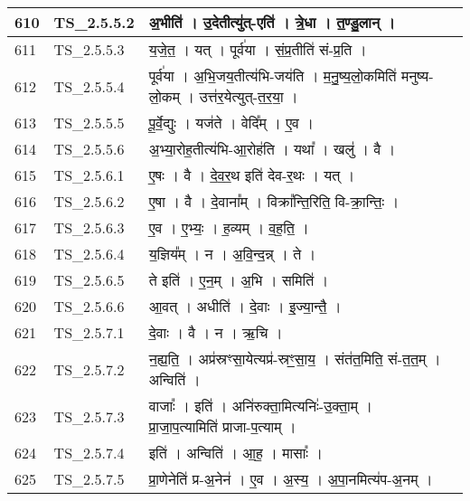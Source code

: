 \documentclass[17pt]{extarticle}
\begin{document}
\begin{longtable}{||p{0.4in}||p{0.9in}||p{4.0in}||p{0.9in}||}
        \hline
            610 & TS\_2.5.5.2 & अ॒भीति॑   ।   उ॒देतीत्यु॑त्{-}एति॑   ।   त्रे॒धा   ।   त॒ण्डु॒लान्   ।    &      \\
        \hline
            611 & TS\_2.5.5.3 & य॒जे॒त॒   ।   यत्   ।   पूर्व॑या   ।   सं॒प्र॒तीति॑ सं{-}प्र॒ति   ।    &      \\
        \hline
            612 & TS\_2.5.5.4 & पूर्व॑या   ।   अ॒भि॒जय॒तीत्य॑भि{-}जय॑ति   ।   म॒नु॒ष्य॒लो॒कमिति॑ मनुष्य{-}लो॒कम्   ।   उत्त॑र॒येत्युत्{-}त॒र॒या॒   ।    &      \\
        \hline
            613 & TS\_2.5.5.5 & पू॒र्वे॒द्युः   ।   यज॑ते   ।   वेदि᳚म्   ।   ए॒व   ।    &      \\
        \hline
            614 & TS\_2.5.5.6 & अ॒भ्या॒रोह॒तीत्य॑भि{-}आ॒रोह॑ति   ।   यथा᳚   ।   खलु॑   ।   वै   ।    &      \\
        \hline
            615 & TS\_2.5.6.1 & ए॒षः   ।   वै   ।   दे॒व॒र॒थ इति॑ देव{-}र॒थः   ।   यत्   ।    &      \\
        \hline
            616 & TS\_2.5.6.2 & ए॒षा   ।   वै   ।   दे॒वाना᳚म्   ।   विक्रा᳚न्ति॒रिति॒ वि{-}क्रा॒न्तिः॒   ।    &      \\
        \hline
            617 & TS\_2.5.6.3 & ए॒व   ।   ए॒भ्यः॒   ।   ह॒व्यम्   ।   व॒ह॒ति॒   ।    &      \\
        \hline
            618 & TS\_2.5.6.4 & य॒ज्ञिय᳚म्   ।   न   ।   अ॒वि॒न्द॒न्न्   ।   ते   ।    &      \\
        \hline
            619 & TS\_2.5.6.5 & ते इति॑   ।   ए॒न॒म्   ।   अ॒भि   ।   समिति॑   ।    &      \\
        \hline
            620 & TS\_2.5.6.6 & आ॒वत्   ।   अधीति॑   ।   दे॒वाः   ।   इ॒ज्या॒न्तै॒   ।    &      \\
        \hline
            621 & TS\_2.5.7.1 & दे॒वाः   ।   वै   ।   न   ।   ऋ॒चि   ।    &      \\
        \hline
            622 & TS\_2.5.7.2 & न॒ह्य॒ति॒   ।   अप्र॑स्रꣳसा॒येत्यप्र॑{-}स्रꣳ॒॒सा॒य॒   ।   संत॑त॒मिति॒ सं{-}त॒त॒म्   ।   अन्विति॑   ।    &      \\
        \hline
            623 & TS\_2.5.7.3 & वाजाः᳚   ।   इति॑   ।   अनि॑रुक्ता॒मित्यनिः॑{-}उ॒क्ता॒म्   ।   प्रा॒जा॒प॒त्यामिति॑ प्राजा{-}प॒त्याम्   ।    &      \\
        \hline
            624 & TS\_2.5.7.4 & इति॑   ।   अन्विति॑   ।   आ॒ह॒   ।   मासाः᳚   ।    &      \\
        \hline
            625 & TS\_2.5.7.5 & प्रा॒णेनेति॑ प्र{-}अ॒नेन॑   ।   ए॒व   ।   अ॒स्य॒   ।   अ॒पा॒नमित्य॑प{-}अ॒नम्   ।    &      \\

\end{longtable}
\end{document}
